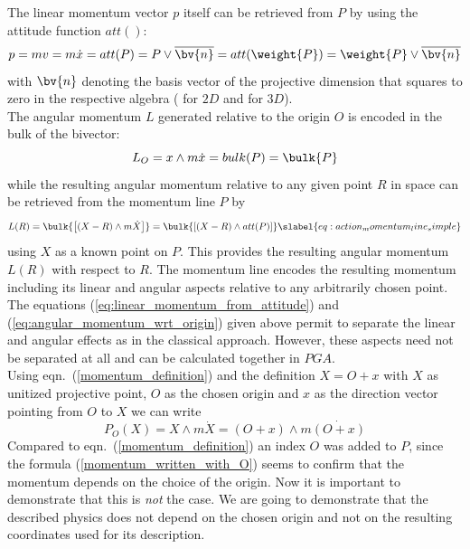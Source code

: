 The linear momentum vector $p$ itself can be retrieved from $P$ by using the attitude
function $att()$:
\begin{equation}
    p = m v = m \dot{x} = att(P) = P \vee \overline{\bv{n}}
                        = att(\weight{P}) = \weight{P} \vee \overline{\bv{n}}
    \label{eq:linear_momentum_from_attitude}
\end{equation}
with $\bv{n}$ denoting the basis vector of the projective dimension that squares to zero
in the respective algebra ( for $2D$ and  for $3D$). \\

The angular momentum $L$ generated relative to the origin $O$ is encoded in the bulk of
the bivector:
\begin{equation}
    L_{O} = x \wedge m \dot{x} = bulk(P) = \bulk{P}
    \label{eq:angular_momentum_wrt_origin}
\end{equation}
while the resulting angular momentum relative to any given point $R$ in space can be
retrieved from the momentum line $P$ by
\begin{equation}
    L(R) = \bulk{\left[ (X-R) \wedge m\dot{X} \right]}
         = \bulk{\left[ (X-R) \wedge att(P) \right]}
           \slabel{eq:action_momentum_line_simple}
\end{equation}
using $X$ as a known point on $P$. This provides the resulting angular momentum $L(R)$
with respect to $R$. The momentum line encodes the resulting momentum including its linear
and angular aspects relative to any arbitrarily chosen point. \\

The equations (\ref{eq:linear_momentum_from_attitude}) and
(\ref{eq:angular_momentum_wrt_origin}) given above permit to separate the linear and
angular effects as in the classical approach. However, these aspects need not be separated
at all and can be calculated together in $PGA$.\\

Using eqn.~(\ref{momentum_definition}) and the definition $X=O + x$ with $X$ as unitized
projective point, $O$ as the chosen origin and $x$ as the direction vector pointing from
$O$ to $X$ we can write
\begin{equation}
    P_O(X) = X \wedge m \dot{X} = (O + x) \wedge m \dot{(O + x)}
    \label{momentum_written_with_O}
\end{equation}
Compared to eqn.~(\ref{momentum_definition}) an index $O$ was added to $P$, since the
formula (\ref{momentum_written_with_O}) seems to confirm that the momentum depends on the
choice of the origin. Now it is important to demonstrate  that this is \emph{not} the
case. We are going to demonstrate that the described physics does not depend on the chosen
origin and not on the resulting coordinates used for its description. \\

